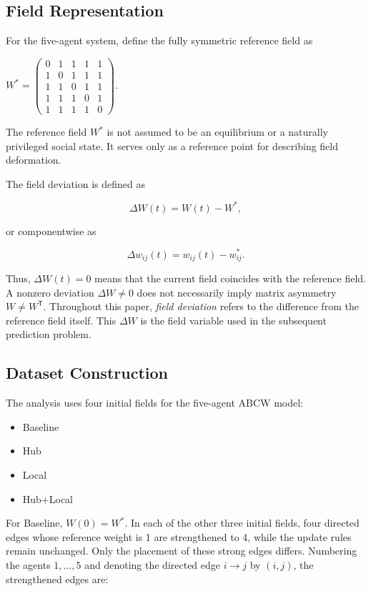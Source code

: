 \documentclass[
  11pt,
]{article}
\providecommand{\tightlist}{%
  \setlength{\itemsep}{0pt}\setlength{\parskip}{0pt}}
\begin{document}
\subsection{Field Representation}\label{field-representation}

For the five-agent system, define the fully symmetric reference field as

\({W^\ast= \begin{pmatrix} 0&1&1&1&1\\ 1&0&1&1&1\\ 1&1&0&1&1\\ 1&1&1&0&1\\ 1&1&1&1&0 \end{pmatrix}.}\)

The reference field \({W^\ast}\) is not assumed to be an equilibrium or
a naturally privileged social state. It serves only as a reference point
for describing field deformation.

The field deviation is defined as

\[{\Delta W(t)=W(t)-W^\ast,}\]

or componentwise as

\[{\Delta w_{ij}(t)=w_{ij}(t)-w^\ast_{ij}.}\]

Thus, \({\Delta W(t)=0}\) means that the current field coincides with
the reference field. A nonzero deviation \({\Delta W\neq0}\) does not
necessarily imply matrix asymmetry \({W\neq W^{\mathsf T}}\). Throughout
this paper, \emph{field deviation} refers to the difference from the
reference field itself. This \({\Delta W}\) is the field variable used
in the subsequent prediction problem.

\subsection{Dataset Construction}\label{dataset-construction}

The analysis uses four initial fields for the five-agent ABCW model:

\begin{itemize}
\tightlist
\item
  Baseline
\item
  Hub
\item
  Local
\item
  Hub+Local
\end{itemize}

For Baseline, \({W(0)=W^\ast}\). In each of the other three initial
fields, four directed edges whose reference weight is 1 are strengthened
to 4, while the update rules remain unchanged. Only the placement of
these strong edges differs. Numbering the agents \({1,\ldots,5}\) and
denoting the directed edge \({i\to j}\) by \({(i,j)}\), the strengthened
edges are:
\end{document}
